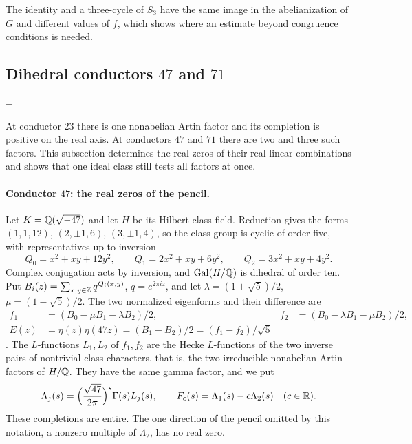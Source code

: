 The identity and a three-cycle of $S_3$ have the same image in the abelianization of $G$ and different
values of $f$, which shows where an estimate beyond congruence conditions is needed.

\subsection{Dihedral conductors \texorpdfstring{$47$ and $71$}{47 and 71}}\label{hec:ss:dihedral}
{\emergencystretch=\textwidth{}}

At conductor $23$ there is one nonabelian Artin factor and its completion is positive on the real axis. At
conductors $47$ and $71$ there are two and three such factors. This subsection determines the real zeros of
their real linear combinations and shows that one ideal class still tests all factors at once.

\paragraph{Conductor $47$: the real zeros of the pencil.}
Let $K=\mathbb{Q}(\sqrt{-47})$ and let $H$ be its Hilbert class field. Reduction gives the forms
$(1,1,12)$, $(2,\pm1,6)$, $(3,\pm1,4)$, so the class group is cyclic of order five, with representatives up
to inversion
\[
 Q_0=x^2+xy+12y^2,\qquad Q_1=2x^2+xy+6y^2,\qquad Q_2=3x^2+xy+4y^2 .
\]
Complex conjugation acts by inversion, and $\operatorname{Gal}(H/\mathbb{Q})$ is dihedral of order ten. Put
$B_i(z)=\sum_{x,y\in\mathbb{Z}}q^{Q_i(x,y)}$, $q=e^{2\pi iz}$, and let $\lambda=(1+\sqrt5)/2$,
$\mu=(1-\sqrt5)/2$. The two normalized eigenforms and their difference are
\begin{align}
 f_1&=(B_0-\mu B_1-\lambda B_2)/2, &
 f_2&=(B_0-\lambda B_1-\mu B_2)/2,\nonumber\\
 E(z)&=\eta(z)\eta(47z)=(B_1-B_2)/2=(f_1-f_2)/\sqrt5 \label{hec:eq:eta47}
\end{align}
\cite{BerkovichPatane2013Binary,BuzzardWeightOne}. The $L$-functions $L_1,L_2$ of $f_1,f_2$ are the Hecke
$L$-functions of the two inverse pairs of nontrivial class characters, that is, the two irreducible
nonabelian Artin factors of $H/\mathbb{Q}$. They have the same gamma factor, and we put
\[
 \Lambda_j(s)=\Bigl(\frac{\sqrt{47}}{2\pi}\Bigr)^{s}\Gamma(s)L_j(s),\qquad
 F_c(s)=\Lambda_1(s)-c\Lambda_2(s)\quad(c\in\mathbb{R}).
\]
These completions are entire. The one direction of the pencil omitted by this notation, a nonzero
multiple of $\Lambda_2$, has no real zero.

